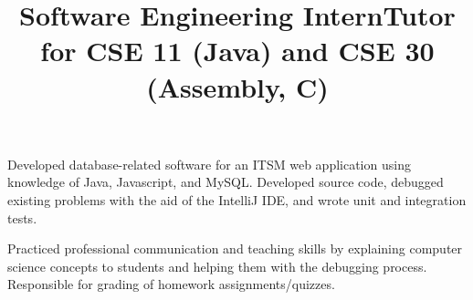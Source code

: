 \documentclass[margin]{res}
\begin{document}
\begin{resume}
\title{\textbf{Software Engineering Intern}}
\begin{position}
Developed database-related software for an ITSM web application using knowledge
of Java, Javascript, and MySQL.  Developed source code, debugged existing
problems with the aid of the IntelliJ IDE, and wrote unit and integration
tests.
\end{position}

\title{\textbf{Tutor for CSE 11 (Java) and CSE 30 (Assembly, C)}}
\begin{position}
Practiced professional communication and teaching skills by explaining computer
science concepts to students and helping them with the debugging process.
Responsible for grading of homework assignments/quizzes.
\end{position}
\end{resume}
\end{document}
